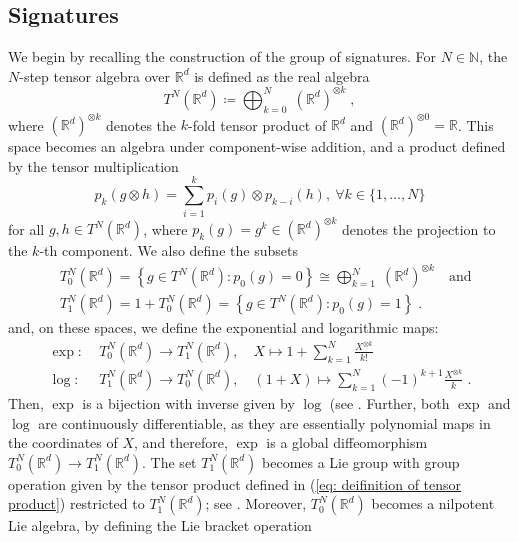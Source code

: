 \documentclass[pdflatex,sn-mathphys-num]{sn-jnl}
\theoremstyle{thmstyletwo}
\theoremstyle{thmstyleone}
\theoremstyle{thmstyletwo}
\newcommand{\R}{\mathbb{R}}
\begin{document}
\subsection{Signatures}\label{sec: signatures}
	We begin by recalling the construction of the group of signatures. For $N \in \mathbb{N}$, the $N$-step tensor algebra over $\R^d$ is defined as the real algebra
	\begin{equation}
		T^N(\mathbb{R}^d) \coloneqq \bigoplus_{k = 0}^N \;(\mathbb{R}^d)^{\otimes k} \;,
	\end{equation}
	where $(\mathbb{R}^d)^{\otimes k}$ denotes the $k$-fold tensor product of $\R^d$ and $(\mathbb{R}^d)^{\otimes 0} = \mathbb{R}$. This space becomes an algebra under component-wise addition, and a product defined by the tensor multiplication
	\begin{equation}\label{eq: deifinition of tensor product}
		p_k(g\otimes h) = \sum_{i=1}^k p_i(g) \otimes p_{k-i}(h),\ \forall k\in \{1,\dots,N\}
	\end{equation}
	for all $g,h \in T^N(\mathbb{R}^d)$, where $p_k(g)=g^k\in (\R^d)^{\otimes k}$ denotes the projection to the $k$-th component.
	We also define the subsets
	\begin{align*}
		&T_0^N\left(\mathbb{R}^d\right) = \left\{g \in T^N\left(\mathbb{R}^d\right): p_0(g)=0\right\} \cong \bigoplus_{k = 1}^N \;(\mathbb{R}^d)^{\otimes k} \quad \text{and}\\
		&T_1^N\left(\mathbb{R}^d\right) = 1+ T_0^N\left(\mathbb{R}^d\right)= \left\{g \in T^N\left(\mathbb{R}^d\right): p_0(g)=1\right\} \;.
	\end{align*}
	and, on these spaces, we define the exponential and logarithmic maps:
	\begin{align}\label{eq: exponential and logarithm}
		\exp :\; &T_0^N\left(\mathbb{R}^d\right) \rightarrow T_1^N\left(\mathbb{R}^d\right), \quad X  \mapsto 1+\sum_{k=1}^N \frac{X^{\otimes k}}{k!}\\
		\log :\; &T_1^N\left(\mathbb{R}^d\right) \rightarrow T_0^N\left(\mathbb{R}^d\right), \quad (1+X) \mapsto \sum_{k=1}^N(-1)^{k+1} \frac{X^{\otimes k}}{k} \;.
	\end{align}
	Then, $\exp$ is a bijection with inverse given by $\log$ (see \cite[Lemma~2.21]{lyons2007roughpaths}. Further, both $\exp$ and $\log$ are continuously differentiable, as they are essentially polynomial maps in the coordinates of $X$, and therefore, $\exp$ is a global diffeomorphism $T_0^N\left(\mathbb{R}^d\right) \to T_1^N\left(\mathbb{R}^d\right)$. The set  $T_1^N\left(\mathbb{R}^d\right)$ becomes a Lie group with group operation given by the tensor product defined in (\ref{eq: deifinition of tensor product}) restricted to $T_1^N\left(\mathbb{R}^d\right)$; see \cite[Proposition 7.17]{friz2010multidimensional}. Moreover, $T_0^N\left(\mathbb{R}^d\right)$ becomes a nilpotent Lie algebra, by defining the Lie bracket operation	
\end{document}
